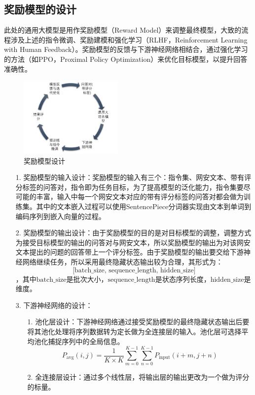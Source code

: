 \subsection{奖励模型的设计}
此处的通用大模型是用作奖励模型（Reward Model）来调整最终模型，大致的流程涉及上述的指令微调、奖励建模和强化学习（RLHF，Reinforcement Learning with Human Feedback）。奖励模型的反馈与下游神经网络相结合，通过强化学习的方法（如PPO\cite{Wang2024APT}，Proximal Policy Optimization）来优化目标模型，以提升回答准确性。
\begin{figure}[htbp]
    \centering
    \includegraphics[width=0.45\textwidth]{./img/rm.png}
    \caption{奖励模型设计}\label{fig:奖励模型设计}
\end{figure}
\begin{itemize}
    \item[1.]奖励模型的输入设计\cite{pmlr-v202-longpre23a}：奖励模型的输入有三个：指令集、网安文本、带有评分标签的问答对，指令即为任务目标，为了提高模型的泛化能力，指令集要尽可能的丰富，输入中每一个网安文本对应的带有评分标签的问答对都会做为训练集。其中的文本嵌入过程可以使用SentencePiece分词器实现由文本到单词到编码序列到嵌入向量的过程。
    \item[2.]奖励模型的输出设计：由于奖励模型的目的是对目标模型的调整，调整方式为接受目标模型的输出的问答对与网安文本，所以奖励模型的输出为对该网安文本提出的问题的回答带上一个评分标签。由于奖励模型的输出要交给下游神经网络继续任务，所以采用最终隐藏状态输出较为合理，其形式为：\[ \text{[batch\_size, sequence\_length,  hidden\_size]} \]，其中$\text{batch\_size}$是批次大小，$\text{sequence\_length}$是状态序列长度，$\text{hidden\_size}$是维度。
    \item[3.] 下游神经网络的设计\cite{Chung2022ScalingIL}：
    \begin{itemize}
        \item[1.]池化层设计：下游神经网络通过接受奖励模型的最终隐藏状态输出后要将其池化处理将序列数据转为定长做为全连接层的输入。池化层可选择平均池化捕捉序列中的全局信息。
        \[P_{\text{avg}}(i, j) = \frac{1}{K \times K} \sum_{m=0}^{K-1} \sum_{n=0}^{K-1} P_{\text{input}}(i + m, j + n)\]
        \item[2.]全连接层设计：通过多个线性层，将输出层的输出更改为一个做为评分的标量。
    \end{itemize}
\end{itemize}
